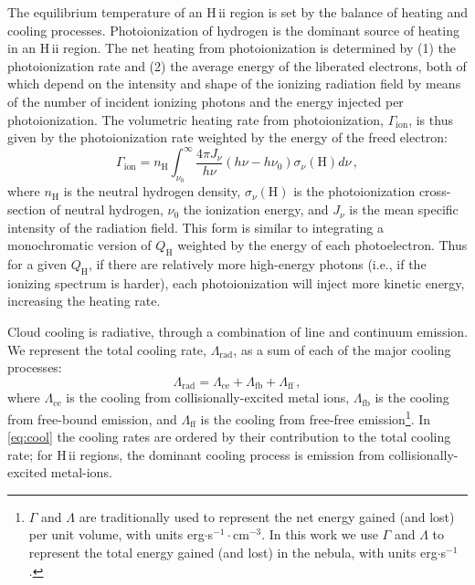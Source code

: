 \documentclass[twocolumn, tighten]{aastex61}
\newcommand{\Eq}[1]{\autoref{eq:#1}}
\newcommand{\hii}{H\,{\sc ii}\xspace}
\newcommand{\nH}{\ensuremath{n_{\mathrm{H}}}}
\newcommand{\QH}{\ensuremath{Q_{\mathrm{H}}}}
\newcommand{\Heat}{\ensuremath{\Gamma_{\mathrm{ion}}}}
\newcommand{\Cool}{\ensuremath{\Lambda_{\mathrm{rad}}}}
\begin{document}
The equilibrium temperature of an \hii region is set by the balance of heating and cooling processes. Photoionization of hydrogen is the dominant source of heating in an \hii region. The net heating from photoionization is determined by (1) the photoionization rate and (2) the average energy of the liberated electrons, both of which depend on the intensity and shape of the ionizing radiation field by means of the number of incident ionizing photons and the energy injected per photoionization. The volumetric heating rate from photoionization, \Heat{}, is thus given by the photoionization rate weighted by the energy of the freed electron:
\begin{equation}\label{eq:heat}
    \Gamma_{\mathrm{ion}} = \nH{} \int_{\nu_0}^{\infty} \frac{4 \pi J_{\nu}}{h\nu} (h \nu - h \nu_0) \sigma_{\nu}(\mathrm{H}) d\nu \,,
\end{equation}
where \nH{} is the neutral hydrogen density, $\sigma_{\nu}(\mathrm{H})$ is the photoionization cross-section of neutral hydrogen, $\nu_0$ the ionization energy,  and $J_{\nu}$ is the mean specific intensity of the radiation field. This form is similar to integrating a monochromatic version of \QH{} weighted by the energy of each photoelectron. Thus for a given \QH{}, if there are relatively more high-energy photons (i.e., if the ionizing spectrum is harder), each photoionization will inject more kinetic energy, increasing the heating rate.

Cloud cooling is radiative, through a combination of line and continuum emission. We represent the total cooling rate, \Cool{}, as a sum of each of the major cooling processes:
\begin{equation}\label{eq:cool}
    \Lambda_{\mathrm{rad}} = \Lambda_{\mathrm{ce}} + \Lambda_{\mathrm{fb}} + \Lambda_{\mathrm{ff}} \, ,
\end{equation}
where $\Lambda_{\mathrm{ce}}$ is the cooling from collisionally-excited metal ions, $\Lambda_{\mathrm{fb}}$ is the cooling from free-bound emission, and $\Lambda_{\mathrm{ff}}$ is the cooling from free-free emission\footnote{$\Gamma$ and $\Lambda$ are traditionally used to represent the net energy gained (and lost) per unit volume, with units erg$\cdot$s$^{-1}\cdot$cm$^{-3}$. In this work we use $\Gamma$ and $\Lambda$ to represent the total energy gained (and lost) in the nebula, with units erg$\cdot$s$^{-1}$.}. In \Eq{cool} the cooling rates are ordered by their contribution to the total cooling rate; for \hii regions, the dominant cooling process is emission from collisionally-excited metal-ions.
\end{document}
